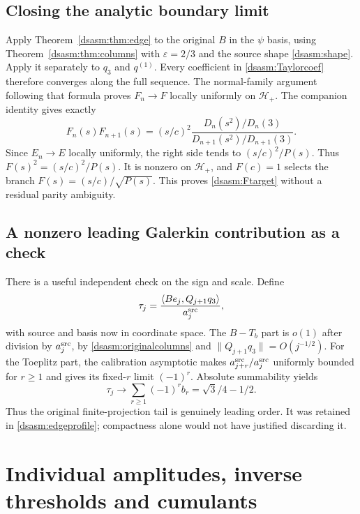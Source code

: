 \documentclass[11pt,letterpaper]{article}
\theoremstyle{remark}\newtheorem{remark}[theorem]{Remark}
\newcommand{\eps}{\varepsilon}\newcommand{\HH}{\mathcal H}\newcommand{\one}{\mathbf1}
\begin{document}
\subsection{Closing the analytic boundary limit}
Apply Theorem~\ref{dsasm:thm:edge} to the original $B$ in the $\psi$ basis,
using Theorem~\ref{dsasm:thm:columns} with $\eps=2/3$ and the source shape
\eqref{dsasm:shape}. Apply it separately to $q_3$ and $q^{(1)}$.
Every coefficient in \eqref{dsasm:Taylorcoef} therefore converges along
the full sequence. The normal-family argument following that formula
proves $F_n\to F$ locally uniformly on $\HH_+$.
The companion identity gives exactly
\[
 F_n(s)F_{n+1}(s)
  =(s/c)^2\frac{D_n(s^2)/D_n(3)}{D_{n+1}(s^2)/D_{n+1}(3)}.
\]
Since $E_n\to E$ locally uniformly, the right side tends to
$(s/c)^2/P(s)$. Thus $F(s)^2=(s/c)^2/P(s)$.
It is nonzero on $\HH_+$, and $F(c)=1$ selects the branch
$F(s)=(s/c)/\sqrt{P(s)}$. This proves \eqref{dsasm:Ftarget} without a
residual parity ambiguity.

\subsection{A nonzero leading Galerkin contribution as a check}
There is a useful independent check on the sign and scale.
Define
\[
 \tau_j=\frac{\langle B e_j,Q_{j+1}q_3\rangle}{a_j^{\rm src}},
\]
with source and basis now in coordinate space. The $B-T_b$ part is
$o(1)$ after division by $a_j^{\rm src}$, by
\eqref{dsasm:originalcolumns} and $\|Q_{j+1}q_3\|=O(j^{-1/2})$.
For the Toeplitz part, the calibration asymptotic makes
$a_{j+r}^{\rm src}/a_j^{\rm src}$ uniformly bounded for $r\ge1$
and gives its fixed-$r$ limit $(-1)^r$. Absolute summability yields
\begin{equation}\label{dsasm:taulimit}
 \tau_j\longrightarrow\sum_{r\ge1}(-1)^rb_r=\sqrt3/4-1/2.
\end{equation}
Thus the original finite-projection tail is genuinely leading order.
It was retained in \eqref{dsasm:edgeprofile}; compactness alone would not
have justified discarding it.
\section{Individual amplitudes, inverse thresholds and cumulants}\label{dsasm:sec:consequences}
\end{document}
